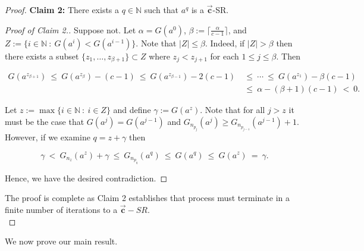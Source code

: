 \documentclass[]{interact}
\newcommand{\N}{{\mathbb N}}  %
\newcommand{\vtr}[1]{\vec{\mathbf{#1}}}
\theoremstyle{plain}
\numberwithin{equation}{section} %
\numberwithin{table}{section} %
\numberwithin{figure}{section}
\begin{document}
\begin{proof}
\noindent \textbf{Claim 2:} There exists a $q\in \N$ such that $a^{q}$ is a $\vtr{c}$-SR.

\begin{proof}[Proof of Claim 2.]
    Suppose not. Let $\alpha=G(a^0)$, $\beta:=\lceil\frac{\alpha}{c-1}\rceil$, and $Z:=\{i\in \N\ :\ G(a^{i})<G(a^{i-1})\}$. Note that $|Z|\leq \beta$. Indeed, if $|Z|> \beta$ then there exists a subset $\{z_1,\ldots,z_{\beta+1}\}\subset Z$ where $z_{j}<z_{j+1}$ for each $1\leq j\leq \beta$. Then

    \begin{align*}
        G(a^{z_{\beta+1}})\ \leq\ G(a^{z_{\beta}})-(c-1)\ \leq\ G(a^{z_{\beta-1}})-2(c-1)\ &\leq\ \cdots\ \leq\ G(a^{z_1})-\beta(c-1)\\
        &\leq\ \alpha-(\beta+1)(c-1)\ <\ 0.
    \end{align*}

    Let $z:=\max\{i\in \N\ :\ i\in Z\}$ and define $\gamma:=G(a^{z})$. Note that for all $j>z$ it must be the case that $G(a^{j})=G(a^{j-1})$ and $G_{n_{p_j}}(a^j)\geq G_{n_{p_{j-1}}}(a^{j-1})+1$. However, if we examine $q=z+\gamma$ then

    $$\gamma\ <\ G_{n_{z}}(a^z)+\gamma\ \leq\ G_{n_{p_{q}}}(a^{q})\ \leq\  G(a^q)\ \leq\  G(a^z)\ =\ \gamma. $$

    Hence, we have the desired contradiction.
    
\end{proof}
The proof is complete as Claim 2 establishes that process must terminate in a finite number of iterations to a $\vtr{c}-SR$.\\
\end{proof}

We now prove our main result.
\end{document}
